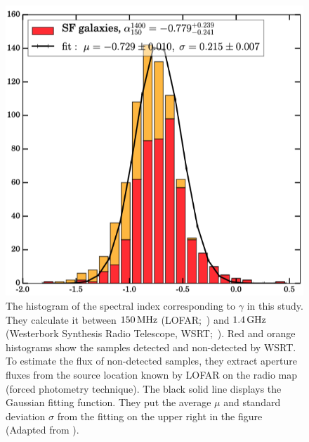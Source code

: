 \begin{figure}[htbp]
	\centering
	\includegraphics[width=.7\linewidth]{Chapter_6/Figures/CalistroRivera2017_Figure7.png}
    \caption[The histogram of the spectral index in \citet{CalistroRivera2017a}]{\label{fig:CalistroRivera2017_figure7}
        The histogram of the spectral index corresponding to $\gamma$ in this study.
        They calculate it between $150\,\mathrm{MHz}$ (LOFAR;~\citealt{Williams2016}) and $1.4\,\mathrm{GHz}$ (Westerbork Synthesis Radio Telescope, WSRT;~\citealt{DeVries2002}).
        Red and orange histograms show the samples detected and non-detected by WSRT\@.
        To estimate the flux of non-detected samples, they extract aperture fluxes from the source location known by LOFAR on the radio map (forced photometry technique).
        The black solid line displays the Gaussian fitting function.
        They put the average $\mu$ and standard deviation $\sigma$ from the fitting on the upper right in the figure
        (Adapted from \citealt{CalistroRivera2017a}).
    }
\end{figure}

